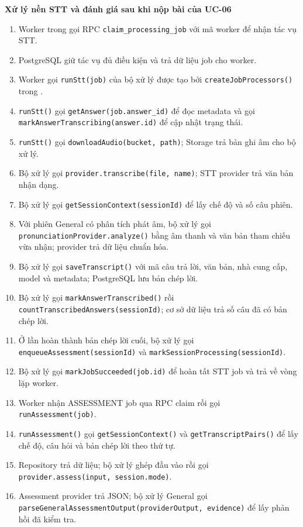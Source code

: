 \documentclass[12pt,a4paper,oneside]{report}
\begin{document}
\noindent\textbf{Xử lý nền STT và đánh giá sau khi nộp bài của UC-06}
\begin{enumerate}
    \item Worker trong  gọi RPC \texttt{claim\_processing\_job} với mã worker để nhận tác vụ STT.
    \item PostgreSQL giữ tác vụ đủ điều kiện và trả dữ liệu job cho worker.
    \item Worker gọi \texttt{runStt(job)} của bộ xử lý được tạo bởi \texttt{createJobProcessors()} trong .
    \item \texttt{runStt()} gọi \texttt{getAnswer(job.answer\_id)} để đọc metadata và gọi \texttt{markAnswerTranscribing(answer.id)} để cập nhật trạng thái.
    \item \texttt{runStt()} gọi \texttt{downloadAudio(bucket, path)}; Storage trả bản ghi âm cho bộ xử lý.
    \item Bộ xử lý gọi \texttt{provider.transcribe(file, name)}; STT provider trả văn bản nhận dạng.
    \item Bộ xử lý gọi \texttt{getSessionContext(sessionId)} để lấy chế độ và số câu phiên.
    \item Với phiên General có phân tích phát âm, bộ xử lý gọi \texttt{pronunciationProvider.analyze()} bằng âm thanh và văn bản tham chiếu vừa nhận; provider trả dữ liệu chuẩn hóa.
    \item Bộ xử lý gọi \texttt{saveTranscript()} với mã câu trả lời, văn bản, nhà cung cấp, model và metadata; PostgreSQL lưu bản chép lời.
    \item Bộ xử lý gọi \texttt{markAnswerTranscribed()} rồi \texttt{countTranscribedAnswers(sessionId)}; cơ sở dữ liệu trả số câu đã có bản chép lời.
    \item Ở lần hoàn thành bản chép lời cuối, bộ xử lý gọi \texttt{enqueueAssessment(sessionId)} và \texttt{markSessionProcessing(sessionId)}.
    \item Bộ xử lý gọi \texttt{markJobSucceeded(job.id)} để hoàn tất STT job và trả về vòng lặp worker.
    \item Worker nhận ASSESSMENT job qua RPC claim rồi gọi \texttt{runAssessment(job)}.
    \item \texttt{runAssessment()} gọi \texttt{getSessionContext()} và \texttt{getTranscriptPairs()} để lấy chế độ, câu hỏi và bản chép lời theo thứ tự.
    \item Repository trả dữ liệu; bộ xử lý ghép đầu vào rồi gọi \texttt{provider.assess(input, session.mode)}.
    \item Assessment provider trả JSON; bộ xử lý General gọi \texttt{parseGeneralAssessmentOutput(providerOutput, evidence)} để lấy phản hồi đã kiểm tra.

\end{enumerate}
\end{document}
